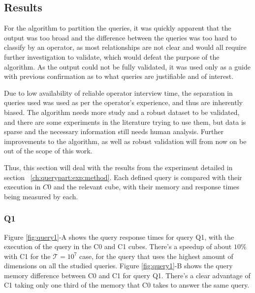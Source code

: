 \subsection{Results}\label{ch:querypart:exp:results}

For the algorithm to partition the queries, it was quickly apparent that the output was too broad and the difference between the queries was too hard to classify by an operator, as most relationships are not clear and would all require further investigation to validate, which would defeat the purpose of the algorithm.
As the output could not be fully validated, it was used only as a guide with previous confirmation as to what queries are justifiable and of interest.

Due to low availability of reliable operator interview time, the separation in queries used was used as per the operator's experience, and thus are inherently biased.
The algorithm needs more study and a robust dataset to be validated, and there are some experiments in the literature trying to use them, but data is sparse and the necessary information still needs human analysis.
Further improvements to the algorithm, as well as robust validation will from now on be out of the scope of this work.

Thus, this section will deal with the results from the experiment detailed in section ~\ref{ch:querypart:exp:method}.
Each defined query is compared with their execution in $C0$ and the relevant cube, with their memory and response times being measured by each.

\hypertarget{q1-1}{%
\subsubsection{Q1}\label{q1-1}}

Figure \ref{fig:query1}-A shows the query response times for query Q1, with the execution of the query in the C0 and C1 cubes.
There's a speedup of about \(10\)\% with C1 for the \(\mathcal{T} =\ensuremath{10^{7}}\) case, for the query that uses the highest amount of dimensions on all the studied queries.
Figure \ref{fig:query1}-B shows the query memory difference between C0 and C1 for query Q1.
There's a clear advantage of C1 taking only one third of the memory that C0 takes to answer the same query.

